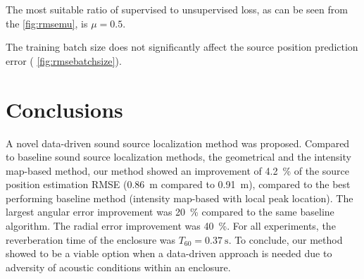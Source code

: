 \documentclass[applsci,article,submit,moreauthors,pdftex]{Definitions/mdpi}
\begin{document}
The most suitable ratio of supervised to unsupervised loss, as can be seen from the \figurename{} \ref{fig:rmsemu}, is $ \mu = 0.5 $. 

The training batch size does not significantly affect the source position prediction error (\figurename{} \ref{fig:rmsebatchsize}).


\section{Conclusions}

A novel data-driven sound source localization method was proposed. Compared to baseline sound source localization methods, the geometrical and the intensity map-based method, our method showed an improvement of \SI{4.2}{\percent} of the source position estimation RMSE (\SI{0.86}{\m} compared to \SI{0.91}{\m}), compared to the best performing baseline method (intensity map-based with local peak location). The largest angular error improvement was \SI{20}{\percent} compared to the same baseline algorithm. The radial error improvement was \SI{40}{\percent}. For all experiments, the reverberation time of the enclosure was $ T_{60} = \SI{0.37}{\second}$. To conclude, our method showed to be a viable option when a data-driven approach is needed due to adversity of acoustic conditions within an enclosure.

%
\end{document}
